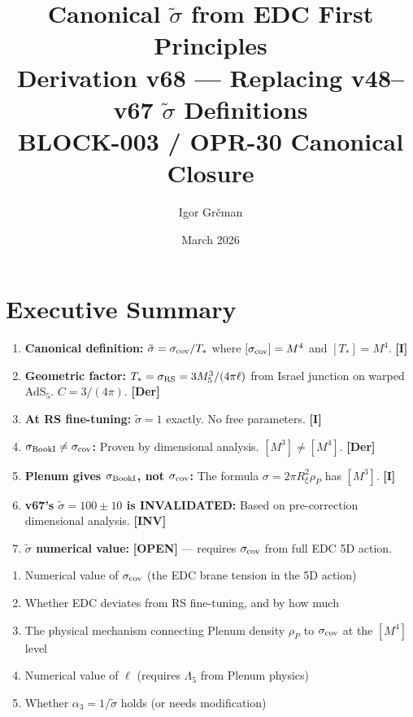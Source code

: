 \documentclass[11pt,a4paper]{article}
\title{\textbf{Canonical $\tilde{\sigma}$ from EDC First Principles}\\[0.5em]
\large Derivation v68 --- Replacing v48--v67 $\tilde\sigma$ Definitions\\[0.3em]
\normalsize BLOCK-003 / OPR-30 Canonical Closure}
\author{Igor Gr\v{c}man}
\date{March 2026}
\newcommand{\tagDer}{\textcolor{derivedblue}{\textbf{[Der]}}}
\newcommand{\tagI}{\textcolor{mathpurple}{\textbf{[I]}}}
\newcommand{\tagOPEN}{\textcolor{openred}{\textbf{[OPEN]}}}
\newcommand{\tagINV}{\textcolor{invalidgray}{\textbf{[INV]}}}
\theoremstyle{definition}
\theoremstyle{remark}
\begin{document}
\maketitle

\section{Executive Summary}

\begin{tcolorbox}[colback=blue!5!white, colframe=blue!70!black,
  title={\textbf{What v68 Establishes}}]
\begin{enumerate}
\item \textbf{Canonical definition:} $\tilde\sigma = \sigma_{\rm cov}/T_*$
  where $[\sigma_{\rm cov}] = M^4$ and $[T_*] = M^4$. \hfill \tagI
\item \textbf{Geometric factor:} $T_* = \sigma_{\rm RS} = 3M_5^3/(4\pi\ell)$
  from Israel junction on warped AdS$_5$. $C = 3/(4\pi)$. \hfill \tagDer
\item \textbf{At RS fine-tuning:} $\tilde\sigma = 1$ exactly.
  No free parameters. \hfill \tagI
\item \textbf{$\sigma_{\rm BookI} \neq \sigma_{\rm cov}$:} Proven by
  dimensional analysis. $[M^3] \neq [M^4]$. \hfill \tagDer
\item \textbf{Plenum gives $\sigma_{\rm BookI}$, not $\sigma_{\rm cov}$:}
  The formula $\sigma = 2\pi R_\xi^2 \rho_P$ has $[M^3]$. \hfill \tagI
\item \textbf{v67's $\tilde\sigma = 100\pm10$ is INVALIDATED:}
  Based on pre-correction dimensional analysis. \hfill \tagINV
\item \textbf{$\tilde\sigma$ numerical value:} \tagOPEN{} ---
  requires $\sigma_{\rm cov}$ from full EDC 5D action.
\end{enumerate}
\end{tcolorbox}

\begin{tcolorbox}[colback=red!5!white, colframe=red!70!black,
  title={\textbf{What Remains Open}}]
\begin{enumerate}
\item Numerical value of $\sigma_{\rm cov}$ (the EDC brane tension in
  the 5D action)
\item Whether EDC deviates from RS fine-tuning, and by how much
\item The physical mechanism connecting Plenum density $\rho_P$ to
  $\sigma_{\rm cov}$ at the $[M^4]$ level
\item Numerical value of $\ell$ (requires $\Lambda_5$ from Plenum physics)
\item Whether $\alpha_3 = 1/\tilde\sigma$ holds (or needs modification)
\end{enumerate}
\end{tcolorbox}
\end{document}
